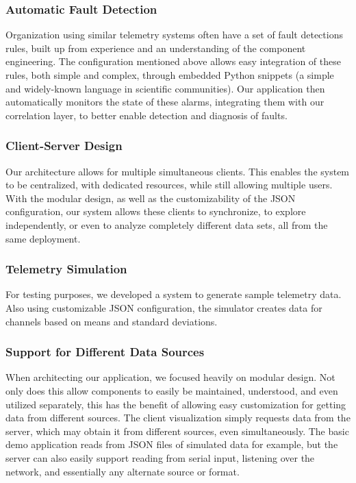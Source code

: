 \documentclass[letterpaper, 10 pt, conference]{ieeeconf}  %
\begin{document}
\subsubsection{Automatic Fault Detection}

Organization using similar telemetry systems often have a set of fault detections rules, built up from experience and an understanding of the component engineering. The configuration mentioned above allows easy integration of these rules, both simple and complex, through embedded Python snippets (a simple and widely-known language in scientific communities). Our application then automatically monitors the state of these alarms, integrating them with our correlation layer, to better enable detection and diagnosis of faults.

\subsubsection{Client-Server Design}

Our architecture allows for multiple simultaneous clients. This enables the system to be centralized, with dedicated resources, while still allowing multiple users. With the modular design, as well as the customizability of the JSON configuration, our system allows these clients to synchronize, to explore independently, or even to analyze completely different data sets, all from the same deployment.

\subsubsection{Telemetry Simulation}

For testing purposes, we developed a system to generate sample telemetry data. Also using customizable JSON configuration, the simulator creates data for channels based on means and standard deviations.

\subsubsection{Support for Different Data Sources}

When architecting our application, we focused heavily on modular design. Not only does this allow components to easily be maintained, understood, and even utilized separately, this has the benefit of allowing easy customization for getting data from different sources. The client visualization simply requests data from the server, which may obtain it from different sources, even simultaneously. The basic demo application reads from JSON files of simulated data for example, but the server can also easily support reading from serial input, listening over the network, and essentially any alternate source or format.
\end{document}
